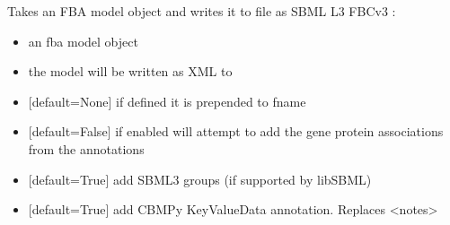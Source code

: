 \documentclass[letterpaper,10pt,english]{sphinxmanual}
\begin{document}
\begin{fulllineitems}
\label{\detokenize{modules_doc:cbmpy.CBWrite.writeSBML3FBCV3}}
\pysigstartsignatures
{}
\pysigstopsignatures
\sphinxAtStartPar
Takes an FBA model object and writes it to file as SBML L3 FBCv3 :
\begin{itemize}
\item {} 
\sphinxAtStartPar
{} an fba model object

\item {} 
\sphinxAtStartPar
{} the model will be written as XML to 

\item {} 
\sphinxAtStartPar
{} {[}default=None{]} if defined it is prepended to fname

\item {} 
\sphinxAtStartPar
{} {[}default=False{]} if enabled will attempt to add the gene protein associations from the annotations

\item {} 
\sphinxAtStartPar
{} {[}default=True{]} add SBML3 groups (if supported by libSBML)

\item {} 
\sphinxAtStartPar
{} {[}default=True{]} add CBMPy KeyValueData annotation. Replaces \textless{}notes\textgreater{}


\end{itemize}
\end{fulllineitems}
\end{document}
